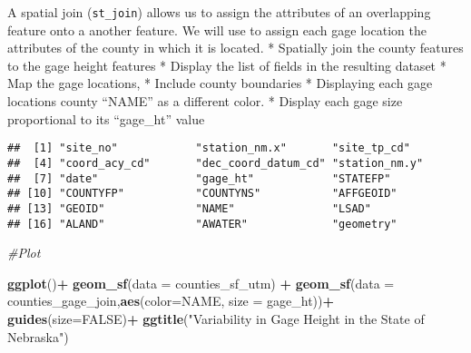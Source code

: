 \documentclass[]{article}
\newenvironment{Shaded}{\begin{snugshade}}{\end{snugshade}}
\newcommand{\KeywordTok}[1]{\textcolor[rgb]{0.13,0.29,0.53}{\textbf{#1}}}
\newcommand{\DataTypeTok}[1]{\textcolor[rgb]{0.13,0.29,0.53}{#1}}
\newcommand{\StringTok}[1]{\textcolor[rgb]{0.31,0.60,0.02}{#1}}
\newcommand{\CommentTok}[1]{\textcolor[rgb]{0.56,0.35,0.01}{\textit{#1}}}
\newcommand{\OtherTok}[1]{\textcolor[rgb]{0.56,0.35,0.01}{#1}}
\newcommand{\OperatorTok}[1]{\textcolor[rgb]{0.81,0.36,0.00}{\textbf{#1}}}
\newcommand{\NormalTok}[1]{#1}
\begin{document}
A spatial join (\texttt{st\_join}) allows us to assign the attributes of
an overlapping feature onto a another feature. We will use to assign
each gage location the attributes of the county in which it is located.
* Spatially join the county features to the gage height features *
Display the list of fields in the resulting dataset * Map the gage
locations, * Include county boundaries * Displaying each gage locations
county ``NAME'' as a different color. * Display each gage size
proportional to its ``gage\_ht'' value

\begin{Shaded}
\end{Shaded}

\begin{verbatim}
##  [1] "site_no"            "station_nm.x"       "site_tp_cd"        
##  [4] "coord_acy_cd"       "dec_coord_datum_cd" "station_nm.y"      
##  [7] "date"               "gage_ht"            "STATEFP"           
## [10] "COUNTYFP"           "COUNTYNS"           "AFFGEOID"          
## [13] "GEOID"              "NAME"               "LSAD"              
## [16] "ALAND"              "AWATER"             "geometry"
\end{verbatim}

\begin{Shaded}
\begin{Highlighting}[]
\CommentTok{#Plot}

\KeywordTok{ggplot}\NormalTok{()}\OperatorTok{+}
\StringTok{  }\KeywordTok{geom_sf}\NormalTok{(}\DataTypeTok{data =}\NormalTok{ counties_sf_utm) }\OperatorTok{+}
\StringTok{  }\KeywordTok{geom_sf}\NormalTok{(}\DataTypeTok{data =}\NormalTok{ counties_gage_join,}\KeywordTok{aes}\NormalTok{(}\DataTypeTok{color=}\NormalTok{NAME, }\DataTypeTok{size =}\NormalTok{ gage_ht))}\OperatorTok{+}
\StringTok{  }\KeywordTok{guides}\NormalTok{(}\DataTypeTok{size=}\OtherTok{FALSE}\NormalTok{)}\OperatorTok{+}
\StringTok{  }\KeywordTok{ggtitle}\NormalTok{(}\StringTok{"Variability in Gage Height in the State of Nebraska"}\NormalTok{)}
\end{Highlighting}
\end{Shaded}
\end{document}
